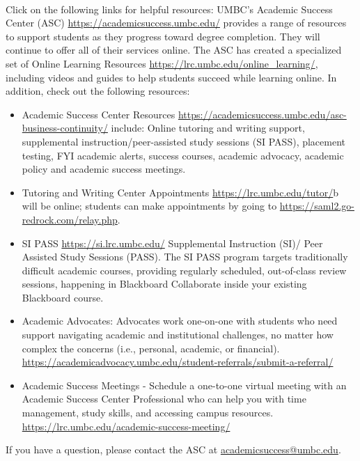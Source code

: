 \documentclass[letter,11pt]{article}
\begin{document}
\paragraph{}Click on the following links for helpful resources:
UMBC’s Academic Success Center (ASC) \url{https://academicsuccess.umbc.edu/} provides a range of resources to support students as they progress toward degree completion. They will continue to offer all of their services online. 
The ASC has created a specialized set of Online Learning Resources \url{https://lrc.umbc.edu/online_learning/}, including videos and guides to help students succeed while learning online.
In addition, check out the following resources:
\begin{itemize}
\item Academic Success Center Resources \url{https://academicsuccess.umbc.edu/asc-business-continuity/} include: Online tutoring and writing support, supplemental instruction/peer-assisted study sessions (SI PASS), placement testing, FYI academic alerts, success courses, academic advocacy, academic policy and academic success meetings.
\item Tutoring and Writing Center Appointments \url{https://lrc.umbc.edu/tutor/}b will be online; students can make appointments by going to \url{https://saml2.go-redrock.com/relay.php}.
\item SI PASS \url{https://si.lrc.umbc.edu/} Supplemental Instruction (SI)/ Peer Assisted Study Sessions (PASS). The SI PASS program targets traditionally difficult academic courses, providing regularly scheduled, out-of-class review sessions, happening in Blackboard Collaborate inside your existing Blackboard course.
\item Academic Advocates: Advocates work one-on-one with students who need support navigating academic and institutional challenges, no matter how complex the concerns (i.e., personal, academic, or financial). \url{https://academicadvocacy.umbc.edu/student-referrals/submit-a-referral/}
\item Academic Success Meetings - Schedule a one-to-one virtual meeting with an Academic Success Center Professional who can help you with time management, study skills, and accessing campus resources. \url{https://lrc.umbc.edu/academic-success-meeting/}
\end{itemize}
If you have a question, please contact the ASC at \href{mailto:academicsuccess@umbc.edu}{academicsuccess@umbc.edu}.

\end{document}
